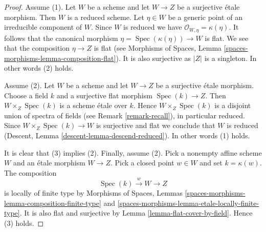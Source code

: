 \documentclass{stacks-project}
\theoremstyle{plain}
\theoremstyle{definition}
\theoremstyle{remark}
\numberwithin{equation}{subsection}
\def\Spec{\mathop{\mathrm{Spec}}}
\begin{document}
\begin{proof}
Assume (1). Let $W$ be a scheme and
let $W \to Z$ be a surjective \'etale morphism. Then $W$ is
a reduced scheme. Let $\eta \in W$ be a generic point of an irreducible
component of $W$. Since $W$ is reduced we have
$\mathcal{O}_{W, \eta} = \kappa(\eta)$. It follows that the canonical
morphism $\eta = \Spec(\kappa(\eta)) \to W$ is flat. We see that the
composition $\eta \to Z$ is flat (see
Morphisms of Spaces, Lemma \ref{spaces-morphisms-lemma-composition-flat}).
It is also surjective as $|Z|$ is a singleton. In other words
(2) holds.

\medskip\noindent
Assume (2). Let $W$ be a scheme and
let $W \to Z$ be a surjective \'etale morphism. Choose a field
$k$ and a surjective flat morphism $\Spec(k) \to Z$.
Then $W \times_Z \Spec(k)$ is a scheme \'etale over $k$.
Hence $W \times_Z \Spec(k)$ is a disjoint union of spectra of fields
(see Remark \ref{remark-recall}), in particular reduced. Since
$W \times_Z \Spec(k) \to W$
is surjective and flat we conclude that $W$ is reduced
(Descent, Lemma \ref{descent-lemma-descend-reduced}).
In other words (1) holds.

\medskip\noindent
It is clear that (3) implies (2). Finally, assume (2). Pick a nonempty
affine scheme $W$ and an \'etale morphism $W \to Z$. Pick a closed
point $w \in W$ and set $k = \kappa(w)$. The composition
$$
\Spec(k) \xrightarrow{w} W \longrightarrow Z
$$
is locally of finite type by
Morphisms of Spaces, Lemmas
\ref{spaces-morphisms-lemma-composition-finite-type} and
\ref{spaces-morphisms-lemma-etale-locally-finite-type}.
It is also flat and surjective by
Lemma \ref{lemma-flat-cover-by-field}.
Hence (3) holds.
\end{proof}
\end{document}
